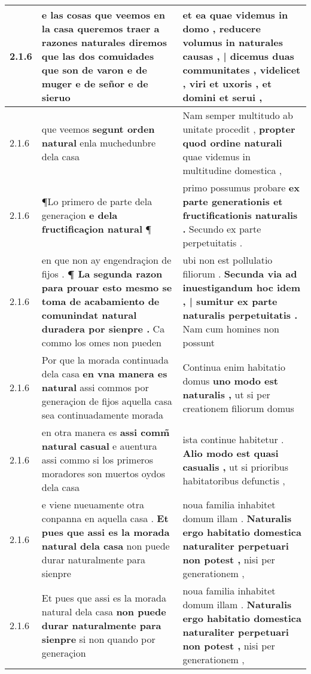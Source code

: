 \begin{tabular}{|p{1cm}|p{6.5cm}|p{6.5cm}|}
2.1.6 & e las cosas que veemos en la casa queremos traer \textbf{ a razones naturales diremos que las dos comuidades } que son de varon e de muger e de señor e de sieruo & et ea quae videmus in domo , \textbf{ reducere volumus in naturales causas , | dicemus duas communitates , } videlicet , viri et uxoris , et domini et serui , \\\hline
2.1.6 & que veemos \textbf{ segunt orden natural } enla muchedunbre dela casa & Nam semper multitudo ab unitate procedit , \textbf{ propter quod ordine naturali } quae videmus in multitudine domestica , \\\hline
2.1.6 & ¶Lo primero de parte dela generaçion \textbf{ e dela fructificaçion natural } ¶ & primo possumus probare \textbf{ ex parte generationis et fructificationis naturalis . } Secundo ex parte perpetuitatis . \\\hline
2.1.6 & en que non ay engendraçion de fijos . \textbf{ ¶ La segunda razon para prouar esto mesmo se toma de acabamiento de comunindat natural duradera por sienpre . } Ca commo los omes non pueden & ubi non est pollulatio filiorum . \textbf{ Secunda via ad inuestigandum hoc idem , | sumitur ex parte naturalis perpetuitatis . } Nam cum homines non possunt \\\hline
2.1.6 & Por que la morada continuada dela casa \textbf{ en vna manera es natural } assi commos por generaçion de fijos aquella casa sea continuadamente morada & Continua enim habitatio domus \textbf{ uno modo est naturalis , } ut si per creationem filiorum domus \\\hline
2.1.6 & en otra manera es \textbf{ assi comm̃ natural casual } e auentura assi commo si los primeros moradores son muertos oydos dela casa & ista continue habitetur . \textbf{ Alio modo est quasi casualis , } ut si prioribus habitatoribus defunctis , \\\hline
2.1.6 & e viene nueuamente otra conpanna en aquella casa . \textbf{ Et pues que assi es la morada natural dela casa } non puede durar naturalmente para sienpre & noua familia inhabitet domum illam . \textbf{ Naturalis ergo habitatio domestica naturaliter perpetuari non potest , } nisi per generationem , \\\hline
2.1.6 & Et pues que assi es la morada natural dela casa \textbf{ non puede durar naturalmente para sienpre } si non quando por generaçion & noua familia inhabitet domum illam . \textbf{ Naturalis ergo habitatio domestica naturaliter perpetuari non potest , } nisi per generationem , \\\hline

\end{tabular}

